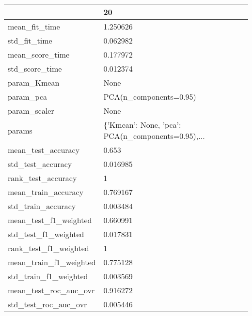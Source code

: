 \begin{tabular}{ll}
\toprule
{} &                                                 20 \\
\midrule
mean\_fit\_time               &                                           1.250626 \\
std\_fit\_time                &                                           0.062982 \\
mean\_score\_time             &                                           0.177972 \\
std\_score\_time              &                                           0.012374 \\
param\_Kmean                 &                                               None \\
param\_pca                   &                             PCA(n\_components=0.95) \\
param\_scaler                &                                               None \\
params                      &  \{'Kmean': None, 'pca': PCA(n\_components=0.95),... \\
mean\_test\_accuracy          &                                              0.653 \\
std\_test\_accuracy           &                                           0.016985 \\
rank\_test\_accuracy          &                                                  1 \\
mean\_train\_accuracy         &                                           0.769167 \\
std\_train\_accuracy          &                                           0.003484 \\
mean\_test\_f1\_weighted       &                                           0.660991 \\
std\_test\_f1\_weighted        &                                           0.017831 \\
rank\_test\_f1\_weighted       &                                                  1 \\
mean\_train\_f1\_weighted      &                                           0.775128 \\
std\_train\_f1\_weighted       &                                           0.003569 \\
mean\_test\_roc\_auc\_ovr       &                                           0.916272 \\
std\_test\_roc\_auc\_ovr        &                                           0.005446 \\

\end{tabular}
